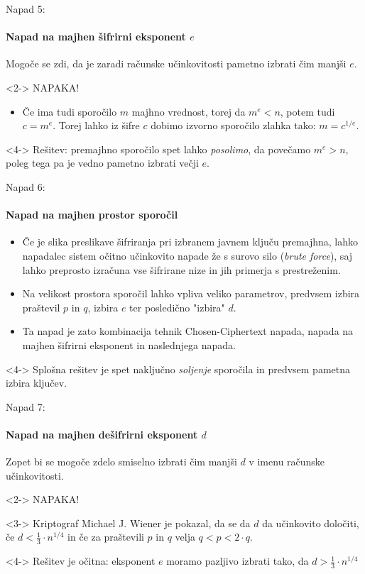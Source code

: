 \documentclass[a4paper, 12pt]{beamer} %
\begin{document}
\begin{frame}{Napad 5:}
 \framesubtitle{Napad na majhen šifrirni eksponent $e$}
Mogoče se zdi, da je zaradi računske učinkovitosti pametno izbrati čim manjši $e$.
\newline
\begin{block}<2->{}
\alert{NAPAKA!}
\end{block}
\begin{itemize}[label=]
\item<3-> Če ima tudi sporočilo $m$ majhno vrednost, torej da $m^e < n$, potem tudi $c = m^e$. Torej lahko iz šifre $c$ dobimo izvorno sporočilo zlahka tako: $m = c^{1/e}$.
\end{itemize}
\begin{block}<4->{}
Rešitev: premajhno sporočilo spet lahko \emph{posolimo}, da povečamo $m^e > n$, poleg tega pa je vedno pametno izbrati večji $e$.
\end{block}
\end{frame}

\begin{frame}{Napad 6:}
\framesubtitle{Napad na majhen prostor sporočil}
\begin{itemize}[label=]
\item<1-> Če je slika preslikave šifriranja pri izbranem javnem ključu premajhna, lahko napadalec sistem očitno učinkovito napade že s surovo silo (\emph{brute force}), saj lahko preprosto izračuna vse šifrirane nize in jih primerja s prestreženim.   
\item<2-> Na velikost prostora sporočil lahko vpliva veliko parametrov, predvsem izbira praštevil $p$ in $q$, izbira $e$ ter posledično "izbira" $d$.
\item<3-> Ta napad je zato kombinacija tehnik Chosen-Ciphertext napada, napada na majhen šifrirni eksponent in naslednjega napada.
\end{itemize}
\begin{block}<4->{}
Splošna rešitev je spet naključno \emph{soljenje} sporočila in predvsem pametna izbira ključev.
\end{block}
\end{frame}

\begin{frame}{Napad 7:}
\framesubtitle{Napad na majhen dešifrirni eksponent $d$}
Zopet bi se mogoče zdelo smiselno izbrati čim manjši $d$ v imenu računske učinkovitosti.
\newline
\begin{block}<2->{}
\alert{NAPAKA!}
\end{block}
\begin{block}<3->{}
Kriptograf Michael J. Wiener je pokazal, da se da $d$ da učinkovito določiti, če $d < \frac{1}{3} \cdot n^{1/4}$ in če za praštevili $p$ in $q$ velja $q < p < 2 \cdot q$.
\end{block}
\begin{block}<4->{}
Rešitev je očitna: eksponent $e$ moramo pazljivo izbrati tako, da $d > \frac{1}{3} \cdot n^{1/4}$
\end{block}
\end{frame}
\end{document}
